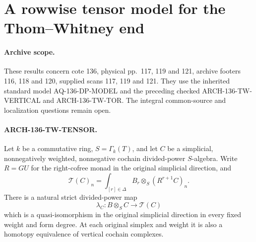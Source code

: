\section{A rowwise tensor model for the Thom--Whitney end}

\paragraph{Archive scope.}
These results concern cote 136, physical pp.~117, 119 and 121,
archive footers 116, 118 and 120, supplied scans 117, 119 and 121.
They use the inherited standard model AQ-136-DP-MODEL and the
preceding checked ARCH-136-TW-VERTICAL and ARCH-136-TW-TOR.
The integral common-source and localization questions remain open.

\paragraph{ARCH-136-TW-TENSOR.}
Let \(k\) be a commutative ring, \(S=\Gamma_k(T)\), and let \(C\) be a simplicial, nonnegatively weighted, nonnegative cochain divided-power \(S\)-algebra. Write \(R=GU\) for the right-cofree monad in the original simplicial direction, and
\[
 \mathcal T(C)_n=\int_{[r]\in\Delta} B_r\otimes_S(R^{r+1}C)_n .
\]
There is a natural strict divided-power map
\[
 \lambda_C:B\otimes_S C\longrightarrow\mathcal T(C)
\]
which is a quasi-isomorphism in the original simplicial direction in every fixed weight and form degree. At each original simplex and weight it is also a homotopy equivalence of vertical cochain complexes.

